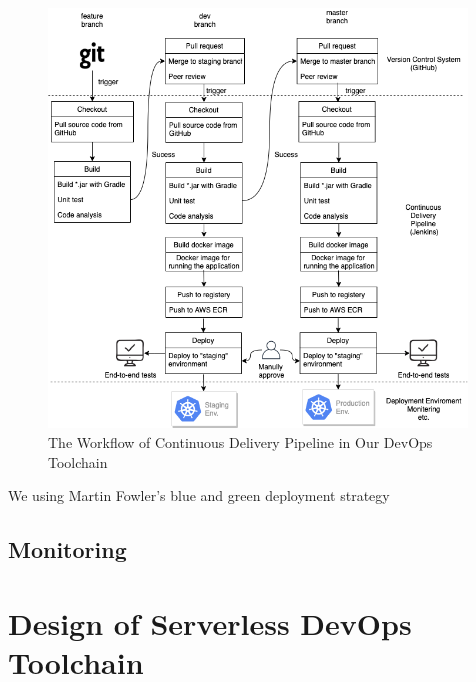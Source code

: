 \begin{figure}[h]
    \centering
    \includegraphics[width=0.99\textwidth]{pics/pipeline.png}
    \caption{The Workflow of Continuous Delivery Pipeline in Our DevOps Toolchain}
    \label{fig:pipeline}
\end{figure}
We using Martin Fowler's blue and green deployment strategy \cite{fowler2010bluegreendeployment}
\subsection{Monitoring}
\section{Design of Serverless DevOps Toolchain}

